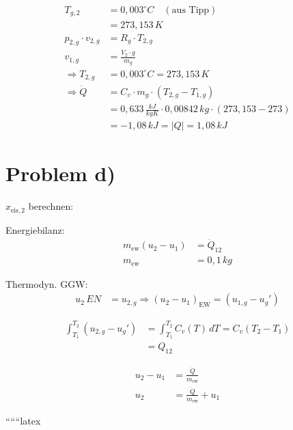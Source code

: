 \begin{align*}
    T_{g,2} &= 0{,}003^\circ C \quad (\text{aus Tipp}) \\
    &= 273{,}153 \, K \\
    p_{2,g} \cdot v_{2,g} &= R_g \cdot T_{2,g} \\
    v_{1,g} &= \frac{V_2 \cdot g}{m_g} \\
    \Rightarrow T_{2,g} &= 0{,}003^\circ C = 273{,}153 \, K \\
    \Rightarrow \dot{Q} &= C_v \cdot m_g \cdot (T_{2,g} - T_{1,g}) \\
    &= 0{,}633 \, \frac{kJ}{kgK} \cdot 0{,}00842 \, kg \cdot (273{,}153 - 273) \\
    &= -1{,}08 \, kJ = |Q| = 1{,}08 \, kJ
\end{align*}

\section*{Problem d)}

$x_{\text{eis},2}$ berechnen:

Energiebilanz:
\begin{align*}
    m_{\text{ew}} (u_2 - u_1) &= \dot{Q}_{12} \\
    m_{\text{ew}} &= 0{,}1 \, kg
\end{align*}

Thermodyn. GGW:
\begin{align*}
    u_2 \, EN &= u_{2,g} \Rightarrow (u_2 - u_1)_{\text{EW}} = (u_{1,g} - u_{g}')
\end{align*}

\begin{align*}
    \int_{T_1}^{T_2} (u_{2,g} - u_{g}') &= \int_{T_1}^{T_2} C_v(T) \, dT = C_v (T_2 - T_1) \\
    &= Q_{12}
\end{align*}

\begin{align*}
    u_2 - u_1 &= \frac{\dot{Q}}{m_{\text{ew}}} \\
    u_2 &= \frac{\dot{Q}}{m_{\text{ew}}} + u_1
\end{align*}

``````latex



